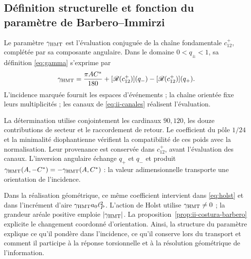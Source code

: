 \subsection{Définition structurelle et fonction du paramètre de Barbero--Immirzi}
\label{sec:ii-definicion-barbero}

\begin{definition}
Le paramètre \(\gamma_{\mathrm{HMT}}\) est l'évaluation conjuguée de la
chaîne fondamentale \(c_{12}^{+}\), complétée par sa composante
angulaire. Dans le domaine \(0<q_\pm<1\), sa définition
\eqref{eq:gamma} s'exprime par
\begin{equation}
 \gamma_{\mathrm{HMT}}
 =\frac{\pi AC^*}{180}
  +[\mathscr R(c_{12}^{+})](q_-)
  -[\mathscr R(c_{12}^{+})](q_+).
 \label{eq:ii-definicion-barbero-evaluacion}
\end{equation}
L'incidence marquée fournit les espaces d'événements ; la chaîne
orientée fixe leurs multiplicités ; les canaux de
\eqref{eq:ii-canales} réalisent l'évaluation.
\end{definition}

La détermination utilise conjointement les cardinaux \(90,120\),
les douze contributions de secteur et le raccordement de retour. Le
coefficient du pôle \(1/24\) et la minimalité diophantienne vérifient
la compatibilité de ces poids avec la normalisation. Leur provenance
est conservée dans \(c_{12}^{+}\), avant l'évaluation des canaux. L'inversion
angulaire échange \(q_+\) et \(q_-\) et produit
\(\gamma_{\mathrm{HMT}}(A,-C^*)=-\gamma_{\mathrm{HMT}}(A,C^*)\) : la valeur
adimensionnelle transporte une orientation de l'incidence.

Dans la réalisation géométrique, ce même coefficient intervient dans
\eqref{eq:holst} et dans l'incrément d'aire
\(\gamma_{\mathrm{HMT}}a_0\ell_P^2\). L'action de Holst utilise
\(\gamma_{\mathrm{HMT}}\ne0\) ; la grandeur aréale positive emploie
\(|\gamma_{\mathrm{HMT}}|\). La proposition~\ref{prop:ii-costura-barbero}
explicite le changement coordonné d'orientation. Ainsi, la structure
du paramètre explique ce qu'il pondère dans l'incidence, ce qu'il conserve
lors du transport et comment il participe à la réponse torsionnelle et à
la résolution géométrique de l'information.
